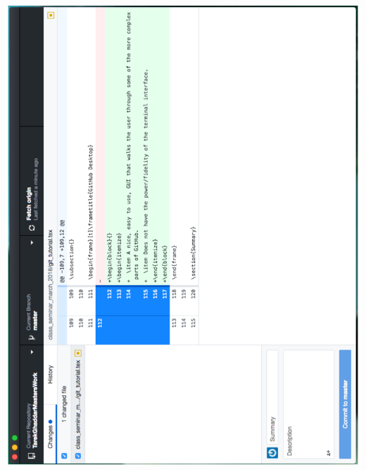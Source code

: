 \documentclass[]{beamer}
\begin{document}
\begin{frame}
\centering
\includegraphics[scale=0.39,angle=-90,origin=c]{figures/desktop_0.pdf}
\end{frame}
\end{document}
